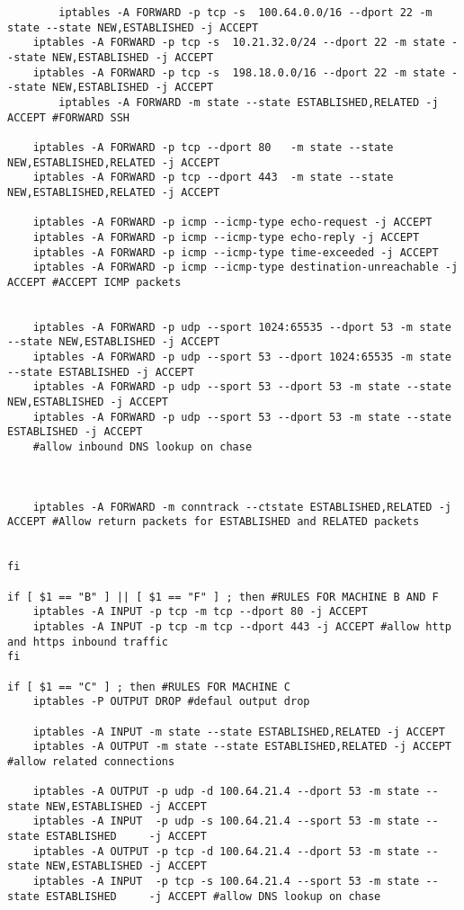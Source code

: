 \documentclass[11pt,onside]{article}
\begin{document}
\begin{lstlisting}
    	iptables -A FORWARD -p tcp -s  100.64.0.0/16 --dport 22 -m state --state NEW,ESTABLISHED -j ACCEPT
	iptables -A FORWARD -p tcp -s  10.21.32.0/24 --dport 22 -m state --state NEW,ESTABLISHED -j ACCEPT
	iptables -A FORWARD -p tcp -s  198.18.0.0/16 --dport 22 -m state --state NEW,ESTABLISHED -j ACCEPT
    	iptables -A FORWARD -m state --state ESTABLISHED,RELATED -j ACCEPT #FORWARD SSH
	
	iptables -A FORWARD -p tcp --dport 80   -m state --state NEW,ESTABLISHED,RELATED -j ACCEPT
	iptables -A FORWARD -p tcp --dport 443  -m state --state NEW,ESTABLISHED,RELATED -j ACCEPT 
	
	iptables -A FORWARD -p icmp --icmp-type echo-request -j ACCEPT
	iptables -A FORWARD -p icmp --icmp-type echo-reply -j ACCEPT
	iptables -A FORWARD -p icmp --icmp-type time-exceeded -j ACCEPT
	iptables -A FORWARD -p icmp --icmp-type destination-unreachable -j ACCEPT #ACCEPT ICMP packets
	

	iptables -A FORWARD -p udp --sport 1024:65535 --dport 53 -m state --state NEW,ESTABLISHED -j ACCEPT
	iptables -A FORWARD -p udp --sport 53 --dport 1024:65535 -m state --state ESTABLISHED -j ACCEPT
	iptables -A FORWARD -p udp --sport 53 --dport 53 -m state --state NEW,ESTABLISHED -j ACCEPT
	iptables -A FORWARD -p udp --sport 53 --dport 53 -m state --state ESTABLISHED -j ACCEPT 
	#allow inbound DNS lookup on chase
	
	

	iptables -A FORWARD -m conntrack --ctstate ESTABLISHED,RELATED -j ACCEPT #Allow return packets for ESTABLISHED and RELATED packets
	

fi

if [ $1 == "B" ] || [ $1 == "F" ] ; then #RULES FOR MACHINE B AND F
	iptables -A INPUT -p tcp -m tcp --dport 80 -j ACCEPT
	iptables -A INPUT -p tcp -m tcp --dport 443 -j ACCEPT #allow http and https inbound traffic
fi

if [ $1 == "C" ] ; then #RULES FOR MACHINE C
	iptables -P OUTPUT DROP #defaul output drop
	
	iptables -A INPUT -m state --state ESTABLISHED,RELATED -j ACCEPT
	iptables -A OUTPUT -m state --state ESTABLISHED,RELATED -j ACCEPT #allow related connections
	
	iptables -A OUTPUT -p udp -d 100.64.21.4 --dport 53 -m state --state NEW,ESTABLISHED -j ACCEPT
	iptables -A INPUT  -p udp -s 100.64.21.4 --sport 53 -m state --state ESTABLISHED     -j ACCEPT
	iptables -A OUTPUT -p tcp -d 100.64.21.4 --dport 53 -m state --state NEW,ESTABLISHED -j ACCEPT
	iptables -A INPUT  -p tcp -s 100.64.21.4 --sport 53 -m state --state ESTABLISHED     -j ACCEPT #allow DNS lookup on chase
	

\end{lstlisting}
\end{document}
